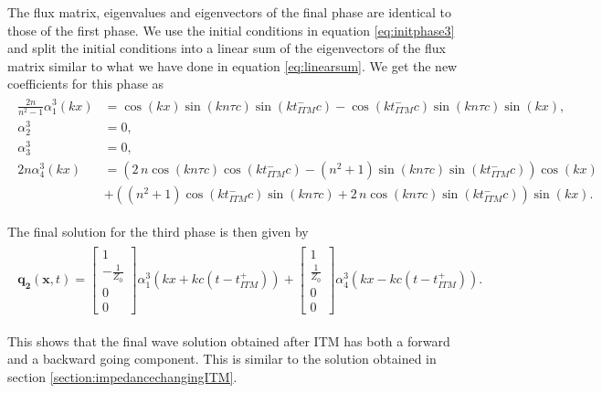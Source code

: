 The flux matrix, eigenvalues and eigenvectors of the final phase are identical to those of the first phase. We use the initial conditions in equation \ref{eq:initphase3}
and split the initial conditions into a linear sum of the eigenvectors of the flux matrix similar to what we have done in equation \ref{eq:linearsum}. 
We get the new coefficients for this phase as
\begin{align}
    \begin{split}
        \frac{2n}{n^2 - 1} \alpha_1^3\left(kx\right) &=  {\cos\left(k x\right) \sin\left(k n \tau c\right) \sin\left(k \mathit{t_{ITM}^-} c\right) - \cos\left(k \mathit{t_{ITM}^-} c\right) \sin\left(k n \tau c\right) \sin\left(k x\right)}, \\
        \alpha_2^3 &= 0, \\
        \alpha_3^3 &= 0, \\
        {2n} \alpha_4^3 \left(kx\right) &= {\left(2 \, n \cos\left(k n \tau c\right) \cos\left(k \mathit{t_{ITM}^-} c\right) - {\left(n^{2} + 1\right)} \sin\left(k n \tau c\right) \sin\left(k \mathit{t_{ITM}^-} c\right)\right)} \cos\left(k x\right) \\
        &+ {\left({\left(n^{2} + 1\right)} \cos\left(k \mathit{t_{ITM}^-} c\right) \sin\left(k n \tau c\right) + 2 \, n \cos\left(k n \tau c\right) \sin\left(k \mathit{t_{ITM}^-} c\right)\right)} \sin\left(k x\right) .
    \end{split}
\end{align}

The final solution for the third phase is then given by
\begin{align}
    \begin{split}
        \mathbf{q_2}\left(\mathbf{x}, t\right) = \begin{bmatrix}
            1 \\
            -\frac{1}{Z_0} \\
            0 \\
            0
        \end{bmatrix} \alpha_1^3 \left(kx + kc \left(t - t_{ITM}^+\right)\right) + 
        \begin{bmatrix}
            1 \\
            \frac{1}{Z_0} \\
            0 \\
            0
        \end{bmatrix} \alpha_4^3 \left(kx - kc \left(t - t_{ITM}^+\right)\right) .
    \end{split}
\end{align}

This shows that the final wave solution obtained after \ac{ITM} has both a forward and a backward going component. This is similar to the solution obtained in section \ref{section:impedancechangingITM}.